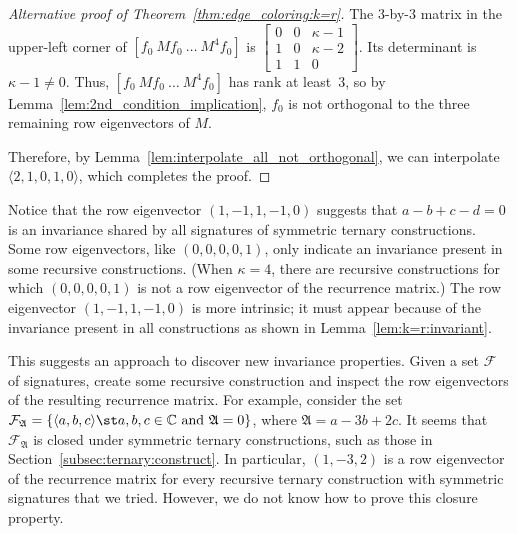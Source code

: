 \documentclass[11pt]{article}
\begin{document}
\begin{proof}[Alternative proof of Theorem~\ref{thm:edge_coloring:k=r}]
 The $3$-by-$3$ matrix in the upper-left corner of $[f_0\ M f_0\ \dots\ M^4 f_0]$ is
 $\left[\begin{smallmatrix} 0 & 0 & \kappa - 1 \\ 1 & 0 & \kappa - 2 \\ 1 & 1 & 0 \end{smallmatrix}\right]$.
 Its determinant is $\kappa - 1 \ne 0$.
 Thus, $[f_0\ M f_0\ \dots\ M^4 f_0]$ has rank at least~$3$,
 so by Lemma~\ref{lem:2nd_condition_implication},
 $f_0$ is not orthogonal to the three remaining row eigenvectors of $M$.
 
 Therefore, by Lemma~\ref{lem:interpolate_all_not_orthogonal},
 we can interpolate $\langle 2,1,0,1,0 \rangle$,
 which completes the proof.
\end{proof}

Notice that the row eigenvector $(1,-1,1,-1,0)$ suggests that $a - b + c - d = 0$ is an invariance shared by all signatures of symmetric ternary constructions.
Some row eigenvectors,
like $(0,0,0,0,1)$,
only indicate an invariance present in some recursive constructions.
(When $\kappa = 4$,
there are recursive constructions for which $(0,0,0,0,1)$ is not a row eigenvector of the recurrence matrix.)
The row eigenvector
$(1,-1,1,-1,0)$ is more intrinsic;
it must appear because of the invariance present in all constructions as shown in Lemma~\ref{lem:k=r:invariant}.

This suggests an approach to discover new invariance properties.
Given a set $\mathcal{F}$ of signatures,
create some recursive construction and inspect the row eigenvectors of the resulting recurrence matrix.
For example,
consider the set $\mathcal{F}_{\mathfrak{A}} = \{\langle a,b,c \rangle \st a,b,c \in \mathbb{C} \text{ and } \mathfrak{A} = 0\}$,
where $\mathfrak{A} = a - 3 b + 2 c$.
It seems that $\mathcal{F}_{\mathfrak{A}}$ is closed under symmetric ternary constructions,
such as those in Section~\ref{subsec:ternary:construct}.
In particular,
$(1,-3,2)$ is a row eigenvector of the recurrence matrix for every recursive ternary construction with symmetric signatures that we tried.
However, we do not know how to prove this closure property.
\end{document}
